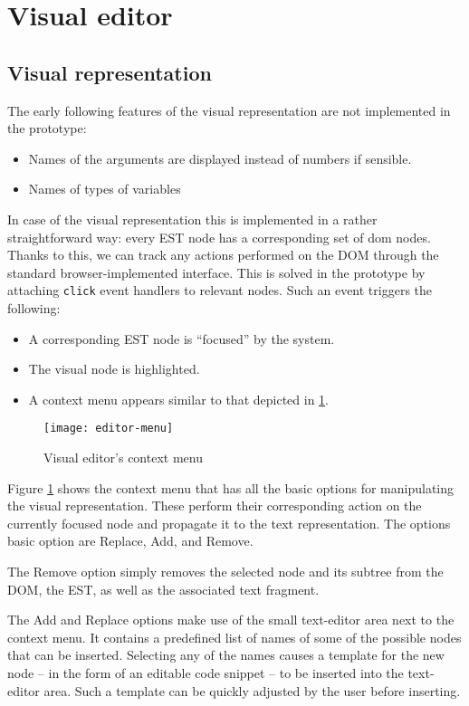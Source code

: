 \section{Visual editor}

\subsection{Visual representation}

The early following features of the visual representation are not implemented in the prototype:
\begin{itemize}
	\item Names of the arguments are displayed instead of numbers if
          sensible.
	\item Names of types of variables
\end{itemize}

In case of the visual representation this is implemented in a rather
straightforward way: every EST node has a corresponding set of \acrshort{dom}
nodes. Thanks to this, we can track any actions performed on the DOM through the
standard browser-implemented interface. This is solved in the prototype by
attaching \texttt{click} event handlers to relevant nodes. Such an event
triggers the following:
\begin{itemize}
    \item A corresponding EST node is ``focused'' by the system.
    \item The visual node is highlighted.
    \item A context menu appears similar to that depicted in
      \ref{fig:editor-menu}.
\end{itemize}

\begin{figure}[h!]
\centering \texttt{[image: editor-menu]}
\caption{Visual editor's context menu}
\label{fig:editor-menu}
\end{figure}

Figure \ref{fig:editor-menu} shows the context menu that has all the basic options for manipulating the visual representation. These perform their corresponding action on the currently focused node and propagate it to the text representation. The options basic option are Replace, Add, and Remove.

The Remove option simply removes the selected node and its subtree from the
DOM, the EST, as well as the associated text fragment.

The Add and Replace options make use of the small text-editor area next to the context menu. It contains a predefined list of names of some of the possible nodes that can be inserted. Selecting any of the names causes a template for the new node -- in the form of an editable code snippet -- to be inserted into the text-editor area. Such a template can be quickly adjusted by the user before inserting.

